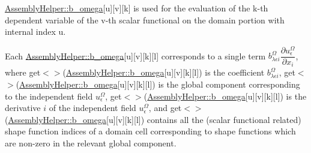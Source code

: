 \hyperlink{class_assembly_helper_a5fbb532e798c2427af5285c2df10c9f4}{Assembly\+Helper\+::b\+\_\+omega}\mbox{[}{\ttfamily u}\mbox{]}\mbox{[}{\ttfamily v}\mbox{]}\mbox{[}{\ttfamily k}\mbox{]} is used for the evaluation of the {\ttfamily k-\/th} dependent variable of the {\ttfamily v-\/th} scalar functional on the domain portion with internal index {\ttfamily u}.

Each \hyperlink{class_assembly_helper_a5fbb532e798c2427af5285c2df10c9f4}{Assembly\+Helper\+::b\+\_\+omega}\mbox{[}{\ttfamily u}\mbox{]}\mbox{[}{\ttfamily v}\mbox{]}\mbox{[}{\ttfamily k}\mbox{]}\mbox{[}{\ttfamily l}\mbox{]} corresponds to a single term $b^\Omega_{\lambda \epsilon i} \dfrac{\partial u^\Omega_\epsilon}{\partial x_i}$, where {\ttfamily get$<${$>$}(\hyperlink{class_assembly_helper_a5fbb532e798c2427af5285c2df10c9f4}{Assembly\+Helper\+::b\+\_\+omega}}\mbox{[}{\ttfamily u}\mbox{]}\mbox{[}{\ttfamily v}\mbox{]}\mbox{[}{\ttfamily k}\mbox{]}\mbox{[}{\ttfamily l}\mbox{]}) is the coefficient $b^\Omega_{\lambda \epsilon i}$, {\ttfamily get$<${$>$}(\hyperlink{class_assembly_helper_a5fbb532e798c2427af5285c2df10c9f4}{Assembly\+Helper\+::b\+\_\+omega}}\mbox{[}{\ttfamily u}\mbox{]}\mbox{[}{\ttfamily v}\mbox{]}\mbox{[}{\ttfamily k}\mbox{]}\mbox{[}{\ttfamily l}\mbox{]}) is the global component corresponding to the independent field $u^\Omega_\epsilon$, {\ttfamily get$<${$>$}(\hyperlink{class_assembly_helper_a5fbb532e798c2427af5285c2df10c9f4}{Assembly\+Helper\+::b\+\_\+omega}}\mbox{[}{\ttfamily u}\mbox{]}\mbox{[}{\ttfamily v}\mbox{]}\mbox{[}{\ttfamily k}\mbox{]}\mbox{[}{\ttfamily l}\mbox{]}) is the derivative $i$ of the independent field $u^\Omega_\epsilon$, and {\ttfamily get$<${$>$}(\hyperlink{class_assembly_helper_a5fbb532e798c2427af5285c2df10c9f4}{Assembly\+Helper\+::b\+\_\+omega}}\mbox{[}{\ttfamily u}\mbox{]}\mbox{[}{\ttfamily v}\mbox{]}\mbox{[}{\ttfamily k}\mbox{]}\mbox{[}{\ttfamily l}\mbox{]}) contains all the (scalar functional related) shape function indices of a domain cell corresponding to shape functions which are non-\/zero in the relevant global component. 
